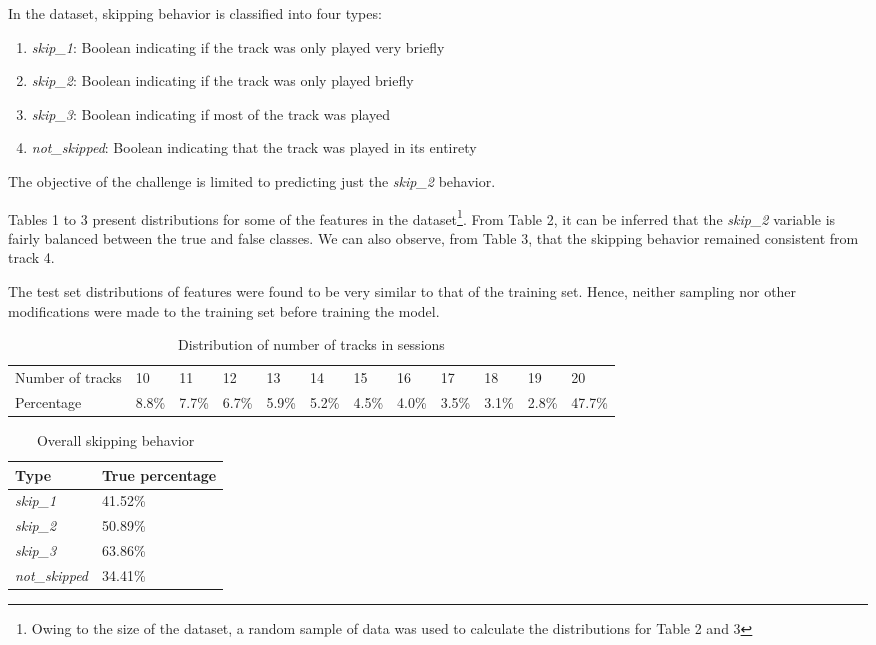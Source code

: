 \documentclass[sigconf]{acmart}
\begin{document}
In the dataset, skipping behavior is classified into four types:
\begin{enumerate}
    \item \textit{skip\_1}: Boolean indicating if the track was only played very briefly
    \item \textit{skip\_2}: Boolean indicating if the track was only played briefly
    \item \textit{skip\_3}: Boolean indicating if most of the track was played
    \item \textit{not\_skipped}: Boolean indicating that the track was played in its entirety
\end{enumerate}
The objective of the challenge is limited to predicting just the \textit{skip\_2} behavior.

Tables 1 to 3 present distributions for some of the features in the dataset\footnote{Owing to the size of the dataset, a random sample of data was used to calculate the distributions for Table 2 and 3}. From Table 2, it can be inferred that the \textit{skip\_2} variable is fairly balanced between the true and false classes. We can also observe, from Table 3, that the skipping behavior remained consistent from track 4.

The test set distributions of features were found to be very similar to that of the training set. Hence, neither sampling nor other modifications were made to the training set before training the model. 

\begin{table*}
\caption{Distribution of number of tracks in sessions}
\begin{tabular}{l|l|l|l|l|l|l|l|l|l|l|l|}
\cline{2-12}
Number of tracks & 10    & 11    & 12    & 13    & 14    & 15    & 16    & 17    & 18    & 19    & 20     \\ \cline{2-12} 
Percentage       & 8.8\% & 7.7\% & 6.7\% & 5.9\% & 5.2\% & 4.5\% & 4.0\% & 3.5\% & 3.1\% & 2.8\% & 47.7\% \\ \cline{2-12} 
\end{tabular}
\end{table*}


\begin{table}
\caption{Overall skipping behavior}
\begin{tabular}{|l|l|}
\hline
Type         & True percentage \\ \hline
\textit{skip\_1}      & 41.52\%           \\ \hline
\textit{skip\_2}      & 50.89\%           \\ \hline
\textit{skip\_3}      & 63.86\%           \\ \hline
\textit{not\_skipped} & 34.41\%          \\ \hline
\end{tabular}
\end{table}
\end{document}
